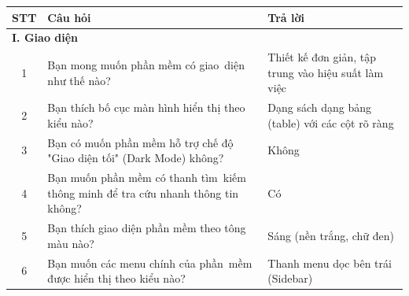 \documentclass[a4paper,12pt]{report}
\begin{document}
\begin{longtable}{|c|p{8cm}|p{7cm}|}
    \hline
    \textbf{STT} & \textbf{Câu hỏi}                                                                                                        & \textbf{Trả lời}                                                                                                         \\
    \hline
    \multicolumn{3}{|l|}{\textbf{I. Giao diện}}                                                                                                                                                                                                                       \\
    \hline
    1            & Bạn mong muốn phần mềm có giao~diện như thế nào?                                                                        & Thiết kế đơn giản, tập trung vào hiệu suất làm việc                                                                      \\
    \hline
    2            & Bạn thích bố cục màn hình hiển thị theo kiểu nào?                                                                       & Dạng sách dạng bảng (table) với các cột rõ ràng                                                                          \\
    \hline
    3            & Bạn có muốn phần mềm hỗ trợ chế độ "Giao diện tối" (Dark Mode) không?                                                   & Không                                                                                                                    \\
    \hline
    4            & Bạn muốn phần mềm có thanh tìm~kiếm thông minh để tra cứu nhanh thông tin không?                                        & Có                                                                                                                       \\
    \hline
    5            & Bạn thích giao diện phần mềm theo tông màu nào?                                                                         & Sáng (nền trắng, chữ đen)                                                                                                \\
    \hline
    6            & Bạn muốn các menu chính của phần~mềm được hiển thị theo kiểu nào?                                                       & Thanh menu dọc bên trái (Sidebar)                                                                                        \\

\end{longtable}
\end{document}
